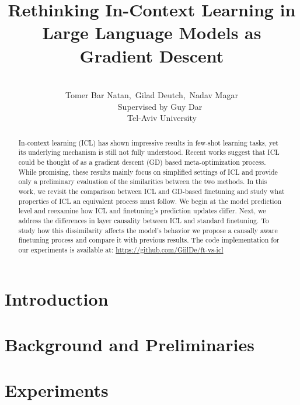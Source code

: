 \documentclass[11pt]{article}
\title{Rethinking In-Context Learning in Large Language Models as Gradient Descent}
\author{\\
Tomer Bar Natan,~Gilad Deutch,~Nadav Magar\\
~~~~Supervised by Guy Dar\\
~~~~~Tel-Aviv University}
\date{}
\begin{document}
\maketitle

\begin{abstract}
	In-context learning (ICL) has shown impressive results in few-shot learning tasks, yet its underlying mechanism is still not fully understood.
	Recent works suggest that ICL could be thought of as a gradient descent (GD) based meta-optimization process.
	While promising, these results mainly focus on simplified settings of ICL and provide only a preliminary evaluation of the similarities between the two methods. 
	In this work, we revisit the comparison between ICL and GD-based finetuning and study what properties of ICL an equivalent process must follow. 
	We begin at the model prediction level and reexamine how ICL and finetuning's prediction updates differ.
	Next, we address the differences in layer causality between ICL and standard finetuning.
	To study how this dissimilarity affects the model's behavior we propose a causally aware finetuning process and compare it with previous results. 
	The code implementation for our experiments is available at:
	\href{https://github.com/GiilDe/ft-vs-icl}{https://github.com/GiilDe/ft-vs-icl}
\end{abstract}

\section{Introduction}


\section{Background and Preliminaries}



\section{Experiments}

\end{document}
